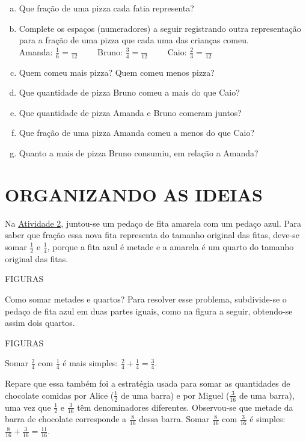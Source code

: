 \begin{atividade}[label=chap5-ativ4]{}
\begin{enumerate}[a)]
\item  Que fração de uma pizza cada fatia representa?
 \item Complete os espaços (numeradores) a seguir registrando outra representação para a fração de uma pizza que cada uma das crianças comeu.\\ Amanda: $\frac{1}{6} =\frac{}{12}  \quad \quad$ Bruno: $\frac{3}{4} =\frac{}{12} \quad \quad$ Caio: $\frac{2}{3} =\frac{}{12}$
 \item Quem comeu mais pizza? Quem comeu menos pizza?
 \item Que quantidade de pizza Bruno comeu a mais do que Caio?
 \item Que quantidade de pizza Amanda e Bruno comeram juntos?
  \item Que fração de uma pizza Amanda comeu a menos do que Caio?
  \item Quanto a mais de pizza Bruno consumiu, em relação a Amanda?
\end{enumerate}
\end{atividade}

\section{ORGANIZANDO AS IDEIAS }

Na \hyperref[chap5-ativ2]{Atividade 2}, juntou-se um pedaço de fita amarela com um pedaço azul. Para saber  que fração essa nova fita representa do tamanho original das fitas, deve-se somar $\frac{1}{2}$ e $\frac{1}{4}$, porque a fita azul é metade e a amarela é um quarto do tamanho original das fitas.

FIGURAS

Como somar metades e quartos? Para resolver esse problema,  subdivide-se o pedaço de fita azul em duas partes iguais, como na figura a seguir, obtendo-se assim dois quartos.

FIGURAS

Somar $\frac{2}{4}$ com $\frac{1}{4}$ é mais simples: $\frac{2}{4} + \frac{1}{4} = \frac{3}{4}$.

Repare que essa também foi a estratégia usada para somar as quantidades de chocolate comidas por Alice ($\frac{1}{2}$ de uma barra) e por Miguel ($\frac{3}{16}$ de uma barra), uma vez que $\frac{1}{2}$ e $\frac{3}{16}$ têm denominadores diferentes. 
Observou-se que metade da barra de chocolate corresponde a $\frac{8}{16}$ dessa barra. 
Somar $\frac{8}{16}$ com $\frac{3}{16}$ é simples: $\frac{8}{16} + \frac{3}{16} = \frac{11}{16}$. 

